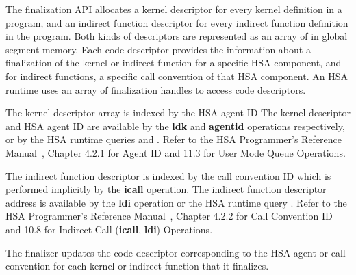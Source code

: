 \documentclass[final,oneside]{book}
\newcommand{\reffun}[1]{\textbf{#1}}
\newcommand{\refhsl}[1]{\reffun{#1}}
\begin{document}
The finalization API allocates a kernel descriptor for every kernel definition
in a program, and an indirect function descriptor for every indirect function
definition in the program. Both kinds of descriptors are represented as an array
of  in global segment memory. Each code
descriptor provides the information about a finalization of the kernel or
indirect function for a specific HSA component, and for indirect functions, a
specific call convention of that HSA component. An HSA runtime uses an array of
finalization handles  to access code
descriptors.

The kernel descriptor array is indexed by the HSA agent ID
 The kernel descriptor and HSA agent ID are
available by the \refhsl{ldk} and \refhsl{agentid} operations respectively, or
by the HSA runtime queries  and
. Refer to the HSA Programmer's Reference
Manual~\cite{prm}, Chapter 4.2.1 for Agent ID and 11.3 for User Mode Queue
Operations.

The indirect function descriptor is indexed by the call convention ID
 which is performed implicitly by
the \refhsl{icall} operation. The indirect function descriptor address is
available by the \refhsl{ldi} operation or the HSA runtime query
. Refer to the HSA
Programmer's Reference Manual~\cite{prm}, Chapter 4.2.2 for Call Convention ID
and 10.8 for Indirect Call (\refhsl{icall}, \refhsl{ldi}) Operations.

The finalizer updates the code descriptor corresponding to the HSA agent or call
convention for each kernel or indirect function that it finalizes.
\end{document}
